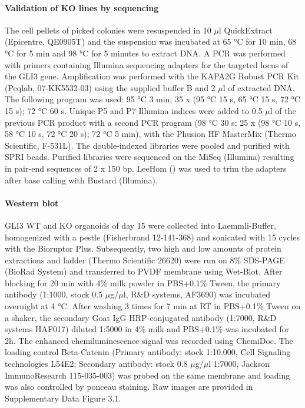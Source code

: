 \paragraph{Validation of KO lines by sequencing}
The cell pellets of picked colonies were resuspended in 10 $\mu$l QuickExtract (Epicentre, QE0905T) and the suspension was incubated at 65 °C for 10 min, 68 °C for 5 min and 98 °C for 5 minutes to extract DNA. A PCR was performed with primers containing Illumina sequencing adapters for the targeted locus of the GLI3 gene. Amplification was performed with the KAPA2G Robust PCR Kit (Peqlab, 07-KK5532-03) using the supplied buffer B and 2 $\mu$l of extracted DNA. The following program was used: 95 °C 3 min; 35 x (95 °C 15 s, 65 °C 15 s, 72  °C 15 s); 72 °C 60 s. Unique P5 and P7 Illumina indices were added to 0.5 $\mu$l of the previous PCR product with a second PCR program (98 °C 30 s; 25 x (98 °C 10 s, 58 °C 10 s, 72 °C 20 s); 72 °C 5 min), with the Phusion HF MasterMix (Thermo Scientific, F-531L). The double-indexed libraries were pooled and purified with SPRI beads. Purified libraries were sequenced on the MiSeq (Illumina) resulting in pair-end sequences of 2 x 150 bp. LeeHom (\cite{renaud_leehom_2014}) was used to trim the adapters after base calling with Bustard (Illumina).
 
\paragraph{Western blot}
GLI3 WT and KO organoids of day 15 were collected into Laemmli-Buffer, homogenized with a pestle (Fisherbrand 12-141-368) and sonicated with 15 cycles with the Bioruptor Plus. Subsequently, two high and low amounts of protein extractions and ladder (Thermo Scientific 26620) were run on 8\% SDS-PAGE (BioRad System) and transferred to PVDF membrane using Wet-Blot. After blocking for 20 min with 4\% milk powder in PBS+0.1\% Tween, the primary antibody (1:1000, stock 0.5 $\mu$g/$\mu$l,  R\&D systems, AF3690) was incubated overnight at 4 °C. After washing 3 times for 7 min at RT in PBS+0.1\% Tween on a shaker, the secondary Goat IgG HRP-conjugated antibody (1:7000, R\&D systems HAF017) diluted 1:5000 in 4\% milk and PBS+0.1\%  was incubated for 2h. The enhanced chemiluminescence signal was recorded using ChemiDoc. The loading control Beta-Catenin (Primary antibody: stock 1:10.000, Cell Signaling technologies L54E2; Secondary antibody: stock 0.8 $\mu$g/$\mu$l 1:7000, Jackson ImmunoResearch 115-035-003) was probed on the same membrane and loading was also controlled by ponceau staining. Raw images are provided in Supplementary Data Figure 3.1.
 
